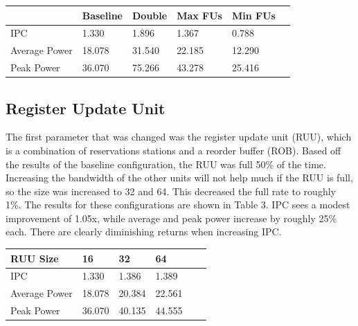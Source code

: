 \documentclass[english]{article}
\begin{document}
\begin{center}
	\vspace{.30cm}
	\begin{tabular}{ | l | l | l | l | l | l |}
		\hline
	  & Baseline & Double & Max FUs & Min FUs \\ \hline
      IPC & 1.330 & 1.896 & 1.367 & 0.788 \\ \hline
      Average Power & 18.078 & 31.540 & 22.185 & 12.290 \\ \hline
      Peak Power & 36.070 & 75.266 & 43.278 & 25.416 \\ \hline
	\end{tabular}
\end{center}

\subsection{Register Update Unit}
The first parameter that was changed was the register update unit (RUU), which is a combination of reservations stations and a reorder buffer (ROB). Based off the results of the baseline configuration, the RUU was full 50\% of the time. Increasing the bandwidth of the other units will not help much if the RUU is full, so the size was increased to 32 and 64. This decreased the full rate to roughly 1\%. The results for these configurations are shown in Table 3. IPC sees a modest improvement of 1.05x, while average and peak power increase by roughly 25\% each. There are clearly diminishing returns when increasing IPC.

\begin{center}
	\vspace{.30cm}
	\begin{tabular}{ | l | l | l | l | l | l |}
		\hline
	 RUU Size & 16 & 32 & 64 \\ \hline
     IPC & 1.330 & 1.386 & 1.389 \\ \hline
     Average Power & 18.078 & 20.384 & 22.561 \\ \hline
     Peak Power & 36.070 & 40.135 & 44.555 \\ \hline
	\end{tabular}
\end{center}
\end{document}

